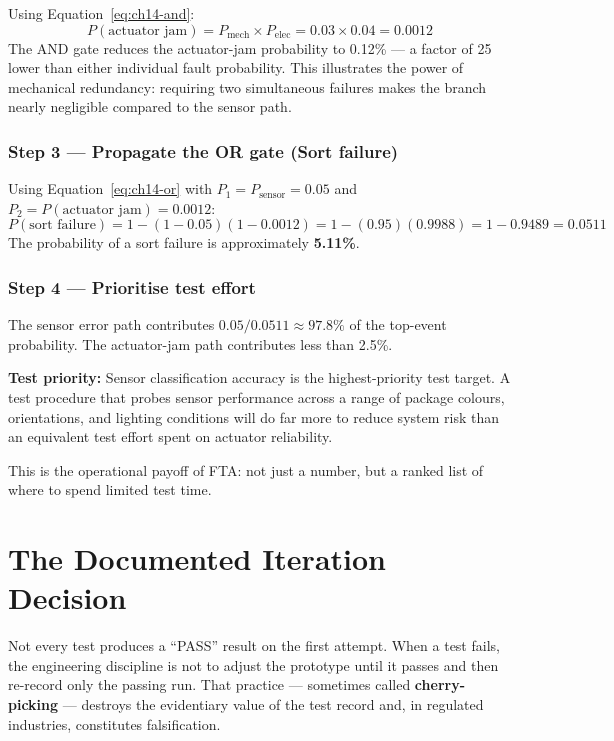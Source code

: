 Using Equation~\ref{eq:ch14-and}:
\[
  P(\text{actuator jam}) = P_{\text{mech}} \times P_{\text{elec}}
                         = 0.03 \times 0.04 = 0.0012
\]
The AND gate reduces the actuator-jam probability to 0.12\% --- a factor of 25 lower than
either individual fault probability.
This illustrates the power of mechanical redundancy: requiring two simultaneous failures
makes the branch nearly negligible compared to the sensor path.

\subsubsection{Step 3 --- Propagate the OR gate (Sort failure)}

Using Equation~\ref{eq:ch14-or} with $P_1 = P_{\text{sensor}} = 0.05$ and
$P_2 = P(\text{actuator jam}) = 0.0012$:
\[
  P(\text{sort failure}) = 1 - (1 - 0.05)(1 - 0.0012)
                         = 1 - (0.95)(0.9988)
                         = 1 - 0.9489
                         = 0.0511
\]
The probability of a sort failure is approximately \textbf{5.11\%}.

\subsubsection{Step 4 --- Prioritise test effort}

The sensor error path contributes $0.05 / 0.0511 \approx 97.8\%$ of the top-event
probability.
The actuator-jam path contributes less than 2.5\%.

\textbf{Test priority:} Sensor classification accuracy is the highest-priority test
target.
A test procedure that probes sensor performance across a range of package colours,
orientations, and lighting conditions will do far more to reduce system risk than an
equivalent test effort spent on actuator reliability.

This is the operational payoff of FTA: not just a number, but a ranked list of where to
spend limited test time.

\section{The Documented Iteration Decision}
\label{sec:ch14-iteration}

Not every test produces a ``PASS'' result on the
first attempt.
When a test fails, the engineering discipline is not to adjust the prototype until it
passes and then re-record only the passing run.
That practice --- sometimes called \textbf{cherry-picking} --- destroys the evidentiary value of the test record and, in regulated
industries, constitutes falsification.


